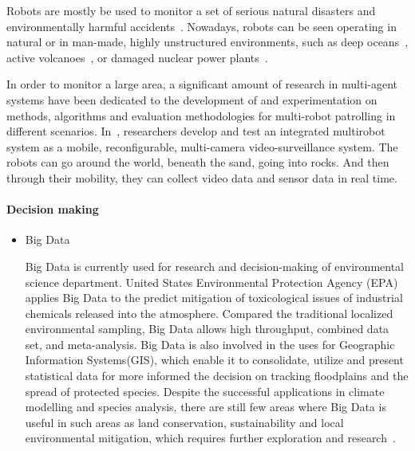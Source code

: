 \documentclass[letterpaper, twocolumn, 10pt, conference]{IEEEtran}
\begin{document}
\begin{itemize}
Robots are mostly be used to monitor a set of serious natural disasters and environmentally harmful accidents~\cite{dunbabin2012robots}. Nowadays, robots can be seen operating in natural or in man-made, highly unstructured environments, such as deep oceans~\cite{whitcomb2010navigation}, active volcanoes~\cite{astuti2009overview}, or damaged nuclear power plants~\cite{guizzo2011japan}. 

In order to monitor a large area, a significant amount of research in multi-agent systems have been dedicated to the development of and experimentation on methods, algorithms and evaluation methodologies for multi-robot patrolling in different scenarios. In~\cite{espina2011multi}, researchers develop and test an integrated multirobot system as a mobile, reconfigurable, multi-camera video-surveillance system. The robots can go around the world, beneath the sand, going into rocks. And then through their mobility, they can collect video data and sensor data in real time.

\end{itemize}

\paragraph{Decision making}

\begin{itemize}

\item Big Data

Big Data is currently used for research and decision-making of environmental science department. United States Environmental Protection Agency (EPA) applies Big Data to the predict mitigation of toxicological issues of industrial chemicals released into the atmosphere. Compared the traditional localized environmental sampling, Big Data allows high throughput, combined data set, and meta-analysis. Big Data is also involved in the uses for Geographic Information Systems(GIS), which enable it to consolidate, utilize and present statistical data for more informed the decision on tracking floodplains and the spread of protected species. Despite the successful applications in climate modelling and species analysis, there are still few areas where Big Data is useful in such areas as land conservation, sustainability and local environmental mitigation, which requires further exploration and research~\cite{bigdata-2018}.

\end{itemize}
\end{document}
